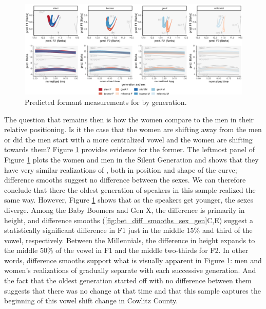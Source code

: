 \begin{figure}[p]
	\centering
	\includegraphics[angle = 90, origin = c, height = \textwidth]{Figures/BET/BET_sex_panel_plot_wide.pdf}
	\caption[Predicted formant measurements for \bet by generation.]{Predicted formant measurements for \bet by generation.}
	\label{fig:BET_sex_panel_plot_wide}
\end{figure}

The question that remains then is how the women compare to the men in their relative positioning. Is it the case that the women are shifting away from the men or did the men start with a more centralized vowel and the women are shifting towards them? Figure \ref{fig:BET_sex_panel_plot_wide} provides evidence for the former. The leftmost panel of Figure \ref{fig:BET_sex_panel_plot_wide} plots the women and men in the Silent Generation and shows that they have very similar realizations of \bet, both in position and shape of the curve; difference smooths suggest no difference between the sexes. We can therefore conclude that there the oldest generation of speakers in this sample realized \bet the same way. However, Figure \ref{fig:BET_sex_panel_plot_wide} shows that as the speakers get younger, the sexes diverge. Among the Baby Boomers and Gen X, the difference is primarily in height, and difference smooths (\ref{fig:bet_diff_smooths_sex_gen}C,E) suggest a statistically significant difference in F1 just in the middle 15\% and third of the vowel, respectively. Between the Millennials, the difference in height expands to the middle 50\% of the vowel in F1 and the middle two-thirds for F2. In other words, difference smooths support what is visually apparent in Figure \ref{fig:BET_sex_panel_plot_wide}: men and women's realizations of \bet gradually separate with each successive generation. And the fact that the oldest generation started off with no difference between them suggests that there was no change at that time and that this sample captures the beginning of this vowel shift change in Cowlitz County.

